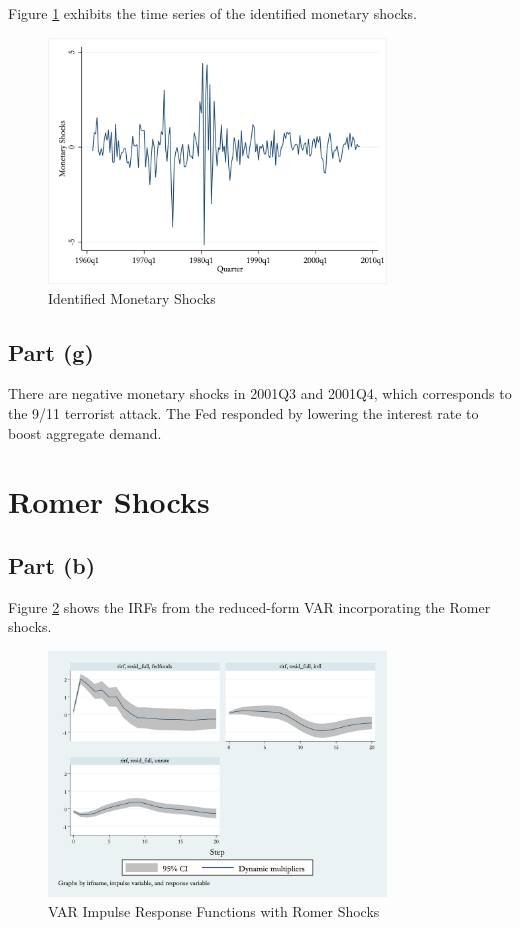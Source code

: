 \documentclass[12pt]{article}
\begin{document}
Figure \ref{fig:estimated_shocks} exhibits the time series of the identified monetary shocks.

\begin{figure}[ht]
    \centering
    \includegraphics[width=0.8\textwidth]{figs/estimated_monetary_shocks}
    \caption{Identified Monetary Shocks}
    \label{fig:estimated_shocks}
\end{figure}


\subsection*{Part (g)} 

There are negative monetary shocks in 2001Q3 and 2001Q4, 
which corresponds to the 9/11 terrorist attack. 
The Fed responded by lowering the interest rate to boost aggregate demand. 


\section{Romer Shocks}


\subsection*{Part (b)} 

Figure \ref{fig:var_irf_rr} shows the IRFs from the reduced-form VAR incorporating the Romer shocks.

\begin{figure}[ht]
    \centering
    \includegraphics[width=0.8\textwidth]{figs/var_rirf.png}
    \caption{VAR Impulse Response Functions with Romer Shocks}
    \label{fig:var_irf_rr}
\end{figure}
\end{document}
